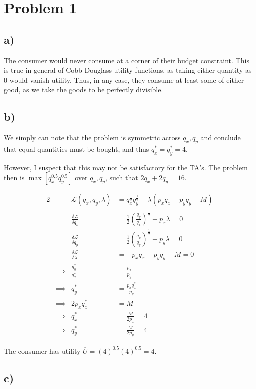 \documentclass[12pt,letterpaper]{article}
\theoremstyle{definition}
\newcommand{\Lag}{\mathcal{L}}
\begin{document}
\section*{Problem 1}

\subsection*{a)}

The consumer would never consume at a corner of their budget constraint. This is
true in general of Cobb-Douglass utility functions, as taking either quantity as
0 would vanish utility. Thus, in any case, they consume at least some of either
good, as we take the goods to be perfectly divisible.

\subsection*{b)}

We simply can note that the problem is symmetric across $q_x, q_y$ and conclude
that equal quantities must be bought, and thus $q_x^* = q_y^* = 4$.

However, I suspect that this may not be satisfactory for the TA's. The problem
then is $\max[q_x^{0.5}q_y^{0.5}]$ over $q_x,q_y$, such that $2q_x + 2q_y = 16$.

\begin{alignat*}{2}
  && \Lag(q_x,q_y,\lambda) &= q_x^{\frac{1}{2}}q_y^{\frac{1}{2}} - \lambda(p_xq_x + p_yq_y - M) \\
  && \frac{\delta \Lag}{\delta q_x} &= \frac{1}{2}(\frac{q_y}{q_x})^{\frac{1}{2}} -
  p_x\lambda = 0 \\
  && \frac{\delta \Lag}{\delta q_y} &= \frac{1}{2}(\frac{q_x}{q_y})^{\frac{1}{2}} -
  p_y\lambda = 0\\
  && \frac{\delta \Lag}{\delta \lambda} &= -p_xq_x - p_yq_y + M = 0 \\
  &\implies& \frac{q_y^*}{q_x^*} &= \frac{p_x}{p_y} \\
  &\implies& q_y^* &= \frac{p_xq_x^*}{p_y} \\
  &\implies& 2p_xq_x^* &= M \\
  &\implies& q_x^* &= \frac{M}{2p_x} = 4\\
  &\implies& q_y^* &= \frac{M}{2p_y} = 4
\end{alignat*}

The consumer has utility $\overline{U} = (4)^{0.5}(4)^{0.5} = 4$.

\subsection*{c)}
\end{document}
